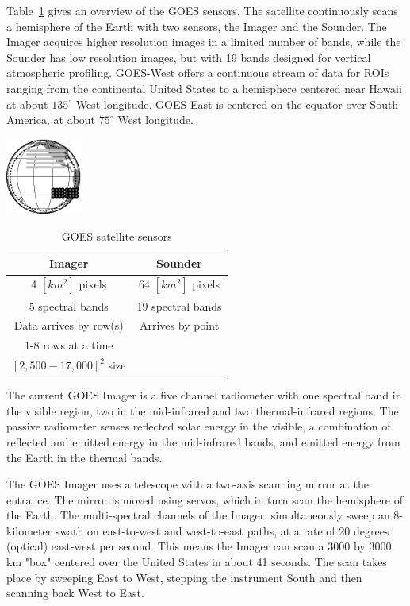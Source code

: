 \documentclass{ucdthesis}       %
\begin{document}
Table~\ref{tab:goes} gives an overview of the \ac{GOES} sensors.  The
satellite continuously scans a hemisphere of the Earth with two
sensors, the Imager and the Sounder.  The Imager acquires higher
resolution images in a limited number of bands, while the Sounder has
low resolution images, but with 19 bands designed for vertical
atmospheric profiling.  \ac{GOES}-West offers a continuous stream of
data for \acp{ROI} ranging from the continental United States to a
hemisphere centered near Hawaii at about $135^\circ$ West longitude.
\ac{GOES}-East is centered on the equator over South America, at about
$75^\circ$ West longitude.

\begin{table}[htb]
  \centering
  \caption{\ac{GOES} satellite sensors}
  \begin{minipage}[t]{2.5cm}
    \vspace*{0pt}
    \includegraphics[width=2.5cm]{figs/motivation-goes.fig.eps}
  \end{minipage}
  \quad
  \begin{tabular}[t]{c | c}
    Imager & Sounder \\
    \hline \hline
    4 $[km^2]$ pixels & 64 $[km^2]$ pixels \\
    5 spectral bands &     19 spectral bands \\
    Data arrives by row(s) & Arrives by point \\
    1-8 rows at a time \\
    $[2,500-17,000]^2$ size \\
  \end{tabular}
  \label{tab:goes}
\end{table}

The current \ac{GOES} Imager is a five channel radiometer with one
spectral band in the visible region, two in the mid-infrared and two
thermal-infrared regions.  The passive radiometer senses reflected
solar energy in the visible, a combination of reflected and emitted
energy in the mid-infrared bands, and emitted energy from the Earth in
the thermal bands.

The \ac{GOES} Imager uses a telescope with a two-axis scanning mirror
at the entrance.  The mirror is moved using servos, which in turn scan
the hemisphere of the Earth.  The multi-spectral channels of the
Imager, simultaneously sweep an 8-kilometer swath on east-to-west and
west-to-east paths, at a rate of 20 degrees (optical) east-west per
second.  This means the Imager can scan a 3000 by 3000 km "box"
centered over the United States in about 41 seconds.  The scan takes
place by sweeping East to West, stepping the instrument South and
then scanning back West to East.
\end{document}
